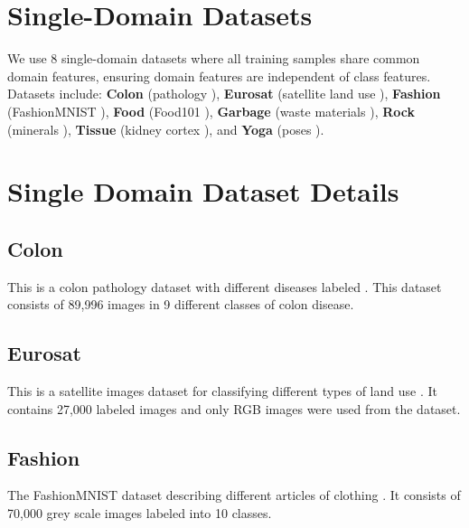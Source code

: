 \documentclass[10pt,twocolumn,letterpaper]{article}
\begin{document}
\section{Single-Domain Datasets}
\label{sec:datasets}

We use $8$ single-domain datasets where all training samples share common domain features, ensuring domain features are independent of class features. Datasets include: \textbf{Colon} (pathology \citep{yang2023medmnist}), \textbf{Eurosat} (satellite land use \citep{helber2019eurosat}), \textbf{Fashion} (FashionMNIST \citep{fashion}), \textbf{Food} (Food101 \citep{food}), \textbf{Garbage} (waste materials \citep{single2023realwaste}), \textbf{Rock} (minerals \citep{rock_data}), \textbf{Tissue} (kidney cortex \citep{yang2023medmnist}), and \textbf{Yoga} (poses \citep{yoga_data}).


\section{Single Domain Dataset Details}
\label{sec:dataset_details}

\subsection{Colon} This is a colon pathology dataset with different diseases labeled \citep{yang2023medmnist}. This dataset consists of 89,996 images in 9 different classes of colon disease.

\subsection{Eurosat} This is a satellite images dataset for classifying different types of land use \citep{helber2019eurosat}. It contains 27,000 labeled images and only RGB images were used from the dataset.

\subsection{Fashion} The FashionMNIST dataset describing different articles of clothing \citep{fashion}. It consists of 70,000 grey scale images labeled into 10 classes.
\end{document}
